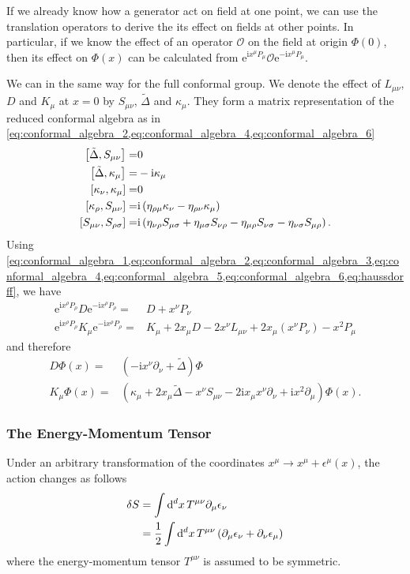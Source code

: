 \documentclass[10pt]{article}
\newcommand{\me}{\mathrm{e}}
\newcommand{\ii}{\mathrm{i}}
\begin{document}
\begin{remark}
    If we already know how a generator act on field at one point, we can use the translation operators to derive the its effect on fields at other points.
    In particular, if we know the effect of an operator $\mathcal{O}$ on the field at origin $\Phi(0)$, then its effect on $\Phi(x)$ can be calculated from $\me^{\ii x^\mu P_\mu}\mathcal{O}\me^{-\ii x^\mu P_\mu}$.
\end{remark}
We can in the same way for the full conformal group.
We denote the effect of $L_{\mu\nu}$, $D$ and $K_\mu$ at $x=0$ by $S_{\mu\nu}$, $\tilde{\Delta}$ and $\kappa_\mu$.
They form a matrix representation of the reduced conformal algebra as in \cref{eq:conformal_algebra_2,eq:conformal_algebra_4,eq:conformal_algebra_6}
\begin{align}
    \comm{\tilde{\Delta}}{S_{\mu\nu}}=&0\\
    \comm{\tilde{\Delta}}{\kappa_\mu}=&-\ii\kappa_\mu\\
    \comm{\kappa_\nu}{\kappa_\mu}=&0\\
    \comm{\kappa_\rho}{S_{\mu\nu}}=&\ii\left(\eta_{\rho\mu}\kappa_{\nu}-\eta_{\rho\nu}\kappa_\mu\right)\\
    \comm{S_{\mu\nu}}{S_{\rho\sigma}}=&\ii\left(\eta_{\nu\rho}S_{\mu\sigma}+\eta_{\mu\sigma}S_{\nu\rho}-\eta_{\mu\rho}S_{\nu\sigma}-\eta_{\nu\sigma}S_{\mu\rho}\right).
\end{align}
Using \cref{eq:conformal_algebra_1,eq:conformal_algebra_2,eq:conformal_algebra_3,eq:conformal_algebra_4,eq:conformal_algebra_5,eq:conformal_algebra_6,eq:haussdorff}, we have 
\begin{align}
    \me^{\ii x^\rho P_\rho}D\me^{-\ii x^\rho P_\rho}=&D+x^\nu P_\nu\\
    \me^{\ii x^\rho P_\rho}K_\mu\me^{-\ii x^\rho P_\rho}=&K_\mu+2x_\mu D-2x^\nu L_{\mu\nu}+2x_\mu\left(x^\nu P_\nu\right)-x^2 P_\mu
\end{align}
and therefore
\begin{align}
    D\Phi(x)=&\left(-\ii x^\nu\partial_\nu+\tilde{\Delta}\right)\Phi\\
    K_\mu\Phi(x)=&\left(\kappa_\mu+2x_\mu\tilde{\Delta}-x^\nu S_{\mu\nu}-2\ii x_\mu x^\nu\partial_\nu+\ii x^2 \partial_\mu\right)\Phi(x).
\end{align}

\subsubsection{The Energy-Momentum Tensor}
Under an arbitrary transformation of the coordinates $x^\mu\to x^\mu+\epsilon^\mu(x)$, the action changes as follows 
\begin{align}
    \delta S&=\int\dd[d]{x}T^{\mu\nu}\partial_\mu\epsilon_\nu \notag\\
            &=\frac{1}{2}\int\dd[d]{x}T^{\mu\nu}\left(\partial_\mu\epsilon_\nu+\partial_\nu\epsilon_\mu\right)
\end{align}
where the energy-momentum tensor $T^{\mu\nu}$ is assumed to be symmetric.
\end{document}
